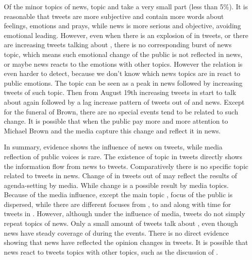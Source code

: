 Of the minor topics of news, topic \pray and \emotion take a very small part (less than 5\%). It is reasonable that tweets are more subjective and contain more words about feelings, emotions and prays, while news is more serious and objective, avoiding emotional leading. However, even when there is an explosion of \emotion in tweets, or there are increasing tweets talking about \pray, there is no corresponding burst of news topic, which means such emotional change of the public is not reflected in news, or maybe news reacts to the emotions with other topics. However the relation is even harder to detect, because we don't know which news topics are in react to public emotions.
The topic \michaelbrown can be seen as a peak in news followed by increasing tweets of such topic. Then from August 19th increasing tweets in \stlouis start to talk about \michaelbrown again followed by a lag increase pattern of tweets out of \stlouis and news. Except for the funeral of Brown, there are no special events tend to be related to such change. It is possible that when the public pay more and more attention to Michael Brown and the media capture this change and reflect it in news.

In summary, evidence shows the influence of news on tweets, while media reflection of public voices is rare. The existence of \newsreport topic in tweets directly shows the information flow from news to tweets. Comparatively there is no specific topic related to tweets in news. Change of \racism in tweets out of \stlouis may reflect the results of agenda-setting by media. While \emotion change is a possible result by media topics. Because of the media influence, except the main topic \racism, focus of the public is dispersed, while there are different focuses from \emotion, \racism to \protest and \pray along with time for tweets in \stlouis. However, although under the influence of media, tweets do not simply repeat topics of news. Only a small amount of tweets talk about \obamatalk, even though news have steady coverage of \obamatalk during the events. There is no direct evidence showing that news have reflected the opinion changes in tweets. It is possible that news react to tweets topics with other topics, such as the discussion of \raceandcommunity.
